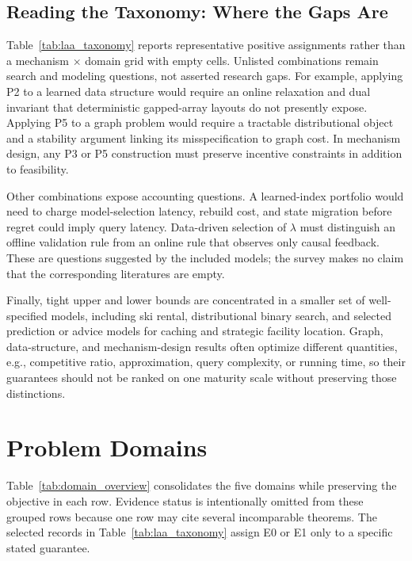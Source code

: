 \documentclass[acmsmall,screen,nonacm]{acmart}
\theoremstyle{acmdefinition}%
\begin{document}
\subsection{Reading the Taxonomy: Where the Gaps Are}
\label{subsec:gaps}


Table~\ref{tab:laa_taxonomy} reports representative positive assignments rather than a mechanism $\times$ domain grid with empty cells. Unlisted combinations remain search and modeling questions, not asserted research gaps. For example, applying P2 to a learned data structure would require an online relaxation and dual invariant that deterministic gapped-array layouts do not presently expose. Applying P5 to a graph problem would require a tractable distributional object and a stability argument linking its misspecification to graph cost. In mechanism design, any P3 or P5 construction must preserve incentive constraints in addition to feasibility.

Other combinations expose accounting questions. A learned-index portfolio would need to charge model-selection latency, rebuild cost, and state migration before regret could imply query latency. Data-driven selection of $\lambda$ must distinguish an offline validation rule from an online rule that observes only causal feedback. These are questions suggested by the included models; the survey makes no claim that the corresponding literatures are empty.

Finally, tight upper and lower bounds are concentrated in a smaller set of well-specified models, including ski rental, distributional binary search, and selected prediction or advice models for caching and strategic facility location. Graph, data-structure, and mechanism-design results often optimize different quantities, e.g., competitive ratio, approximation, query complexity, or running time, so their guarantees should not be ranked on one maturity scale without preserving those distinctions.

%
\section{Problem Domains}
\label{sec:domains}

Table~\ref{tab:domain_overview} consolidates the five domains while preserving the objective in each row. Evidence status is intentionally omitted from these grouped rows because one row may cite several incomparable theorems. The selected records in Table~\ref{tab:laa_taxonomy} assign E0 or E1 only to a specific stated guarantee.
\end{document}
